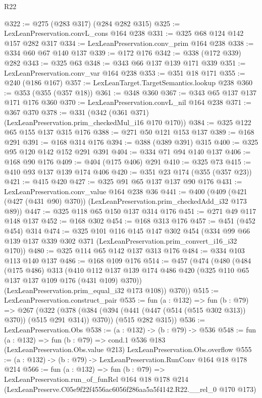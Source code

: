 \begin{lexlean}{R22}
\begin{coremodule}
@322 := @275 (@283 @317) (@284 @282 @315)
@325 := LexLeanPreservation.convL_cons @164 @238
@331 := @325 @68 @124 @142 @157 @282 @317
@334 := LexLeanPreservation.conv_prim @164 @238
@338 := @334 @60 @67 @140 @137
@339 := @172 @176
@342 := @338 (@172 @339) @282
@343 := @325 @63
@348 := @343 @66 @137 @139 @171 @339
@351 := LexLeanPreservation.conv_var @164 @238
@353 := @351 @18 @171
@355 := @240 (@186 @167)
@357 := LexLeanTarget.TargetSemantics.lookup @238
@360 := @353 (@355 (@357 @18))
@361 := @348 @360
@367 := @343 @65 @137 @137 @171 @176 @360
@370 := LexLeanPreservation.convL_nil @164 @238
@371 := @367 @370
@378 := @331 (@342 (@361 @371) (LexLeanPreservation.prim_checkedMul_i16 @170 @170))
@384 := @325 @122 @65 @155 @137 @315 @176
@388 := @271 @50 @121 @153 @137
@389 := @168 @291
@391 := @168 @314 @176
@394 := @388 (@389 @391) @315
@400 := @325 @95 @120 @142 @152 @291 @391
@404 := @334 @71 @94 @140 @137
@406 := @168 @90 @176
@409 := @404 (@175 @406) @291
@410 := @325 @73
@415 := @410 @93 @137 @139 @174 @406
@420 := @351 @23 @174 (@355 (@357 @23))
@421 := @415 @420
@427 := @325 @91 @65 @137 @137 @90 @176
@431 := LexLeanPreservation.conv_value @164 @238 @36
@441 := @400 (@409 (@421 (@427 (@431 @90) @370)) (LexLeanPreservation.prim_checkedAdd_i32 @173 @89))
@447 := @325 @118 @65 @150 @137 @314 @176
@451 := @271 @49 @117 @148 @137
@452 := @168 @302
@454 := @168 @313 @176
@457 := @451 (@452 @454) @314
@474 := @325
    @101
    @116
    @145
    @147
    @302
    @454
    (@334 @99 @66 @139 @137 @339 @302 @371 (LexLeanPreservation.prim_convert_i16_i32 @170))
@480 := @325 @114 @65 @142 @137 @313 @176
@484 := @334 @103 @113 @140 @137
@486 := @168 @109 @176
@514 := @457
    (@474
      (@480
        (@484
          (@175 @486)
          @313
          (@410 @112 @137 @139 @174 @486 @420 (@325 @110 @65 @137 @137 @109 @176 (@431 @109) @370))
          (LexLeanPreservation.prim_equal_i32 @173 @108))
        @370))
@515 := LexLeanPreservation.construct_pair
@535 := fun (a : @132) =>
  fun (b : @79) =>
  @267
    (@322
      (@378 (@384 (@394 (@441 (@447 (@514 (@515 @302 @313)) @370)) (@515 @291 @314)) @370))
      (@515 @282 @315))
@536 := LexLeanPreservation.Obs
@538 := (a : @132) -> (b : @79) -> @536
@548 := fun (a : @132) =>
  fun (b : @79) =>
  cond.{1} @536 @183 (LexLeanPreservation.Obs.value @213) LexLeanPreservation.Obs.overflow
@555 := (a : @132) -> (b : @79) -> LexLeanPreservation.RunConv @164 @18 @178 @214
@566 := fun (a : @132) =>
  fun (b : @79) =>
  LexLeanPreservation.run_of_funRel
    @164
    @18
    @178
    @214
    (LexLeanPreserve.C05e9f22f4556ac6056f286aa5a5f4142.R22.__rel_0 @170 @173)
\end{coremodule}
\end{lexlean}
